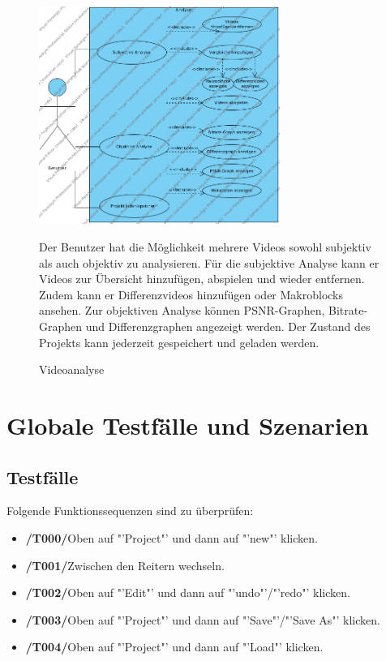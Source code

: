 \documentclass[parskip=full]{scrartcl}
\begin{document}
\begin{figure}[htbp]
{\centering
\includegraphics[width=0.7\textwidth]{UsecaseDiagrams/Analyse.png}
\caption{Videoanalyse} }

Der Benutzer hat die Möglichkeit mehrere Videos sowohl subjektiv als auch objektiv zu analysieren. Für die subjektive Analyse kann er Videos zur Übersicht hinzufügen, abspielen und wieder entfernen. Zudem kann er Differenzvideos hinzufügen oder Makroblocks ansehen.
Zur objektiven Analyse können PSNR-Graphen, Bitrate-Graphen und Differenzgraphen angezeigt werden.
Der Zustand des Projekts kann jederzeit gespeichert und geladen werden.

\end{figure}
\newpage
\section{Globale Testfälle und Szenarien}
\subsection{Testfälle}
Folgende Funktionssequenzen sind zu überprüfen:
\begin{itemize}
\item[]\textbf{/T000/}\qquad Oben auf "'Project"' und dann auf "'new"' klicken.
\item[]\textbf{/T001/}\qquad Zwischen den Reitern wechseln.
\item[]\textbf{/T002/}\qquad Oben auf "'Edit"' und dann auf "'undo"'/"'redo"' klicken.
\item[]\textbf{/T003/}\qquad Oben auf "'Project"' und dann auf "'Save"'/"'Save As"' klicken.
\item[]\textbf{/T004/}\qquad Oben auf "'Project"' und dann auf "'Load"' klicken.
\end{itemize}
\end{document}
